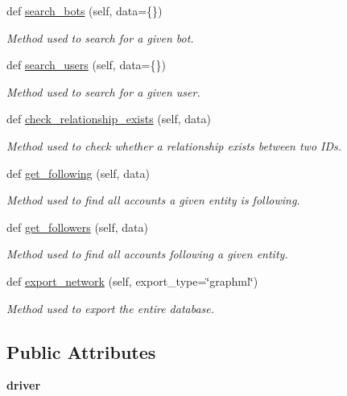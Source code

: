\begin{DoxyCompactItemize}
def \hyperlink{classtwitter_1_1wrappers_1_1neo4j__wrapper_1_1Neo4jAPI_a94d7463864ce54f396cef3b256825f60}{search\+\_\+bots} (self, data=\{\})
\begin{DoxyCompactList}\small\item\em Method used to search for a given bot. \end{DoxyCompactList}\item 
def \hyperlink{classtwitter_1_1wrappers_1_1neo4j__wrapper_1_1Neo4jAPI_a267693caebe2e0e18ed479c8fc7369bf}{search\+\_\+users} (self, data=\{\})
\begin{DoxyCompactList}\small\item\em Method used to search for a given user. \end{DoxyCompactList}\item 
def \hyperlink{classtwitter_1_1wrappers_1_1neo4j__wrapper_1_1Neo4jAPI_a8766eab9dfb3a44143b70175659a5c70}{check\+\_\+relationship\+\_\+exists} (self, data)
\begin{DoxyCompactList}\small\item\em Method used to check whether a relationship exists between two I\+Ds. \end{DoxyCompactList}\item 
def \hyperlink{classtwitter_1_1wrappers_1_1neo4j__wrapper_1_1Neo4jAPI_afe328bc3bff856511ffe291bf6e94e8e}{get\+\_\+following} (self, data)
\begin{DoxyCompactList}\small\item\em Method used to find all accounts a given entity is following. \end{DoxyCompactList}\item 
def \hyperlink{classtwitter_1_1wrappers_1_1neo4j__wrapper_1_1Neo4jAPI_a2a940dd718e1fd4d724b8f47a6d5a896}{get\+\_\+followers} (self, data)
\begin{DoxyCompactList}\small\item\em Method used to find all accounts following a given entity. \end{DoxyCompactList}\item 
def \hyperlink{classtwitter_1_1wrappers_1_1neo4j__wrapper_1_1Neo4jAPI_a9ed611dcf191c1a3bb384090caff703e}{export\+\_\+network} (self, export\+\_\+type=\char`\"{}graphml\char`\"{})
\begin{DoxyCompactList}\small\item\em Method used to export the entire database. \end{DoxyCompactList}\end{DoxyCompactItemize}
\subsection*{Public Attributes}
\begin{DoxyCompactItemize}
\item 
\mbox{\label{classtwitter_1_1wrappers_1_1neo4j__wrapper_1_1Neo4jAPI_aa8d04f27c45991a75026f5030f150969}} 
{\bfseries driver}
\end{DoxyCompactItemize}
